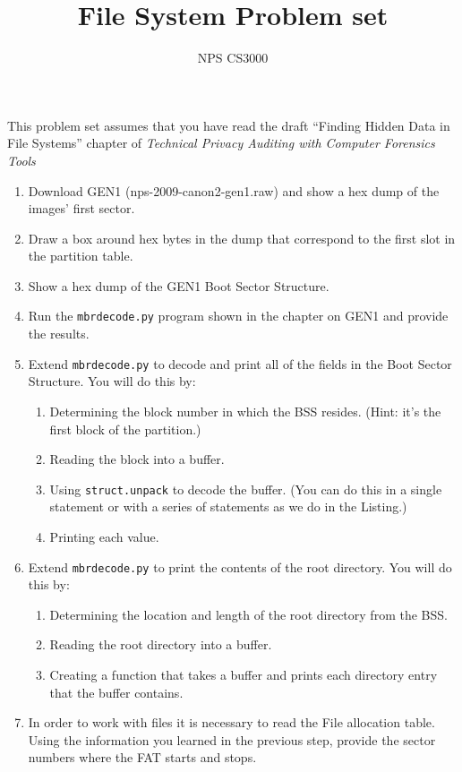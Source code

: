 \documentclass{article}
\begin{document}
\title{File System Problem set}
\author{NPS CS3000}
\maketitle
This problem set assumes that you have read the draft ``Finding Hidden Data
in File Systems'' chapter of \emph{Technical Privacy Auditing with
  Computer Forensics Tools}

\begin{enumerate}
\item Download GEN1 (nps-2009-canon2-gen1.raw) and show a hex dump of the
  images' first sector.
\item Draw a box around hex bytes in the dump that
  correspond to the first slot in the partition table.
\item Show a hex dump of the GEN1 Boot Sector Structure.
\item Run the \texttt{mbrdecode.py} program shown in the chapter on
  GEN1 and provide the results.
\item Extend \texttt{mbrdecode.py} to decode and print all of the
  fields in the Boot Sector Structure. You will do this by:
\begin{enumerate}
  \item Determining the block number in which the BSS resides. (Hint:
    it's the first block of the partition.)
  \item Reading the block into a buffer.
  \item Using \texttt{struct.unpack} to decode the buffer. (You
  can do this in a single statement or with a series of statements as
  we do in the Listing.)
  \item Printing each value. 
\end{enumerate}


\item Extend \texttt{mbrdecode.py} to print the contents of the root
  directory.  You will do this by:
\begin{enumerate}
  \item Determining the location and length of the root directory
    from the BSS.
  \item Reading the root directory into a buffer.
  \item Creating a function that takes a buffer and prints each
    directory entry that the buffer contains. 
\end{enumerate}  

\item In order to work with files it is necessary to read the File
  allocation table. Using the information you learned in the previous
  step, provide the sector numbers where the FAT starts and stops.


\end{enumerate}
\end{document}

